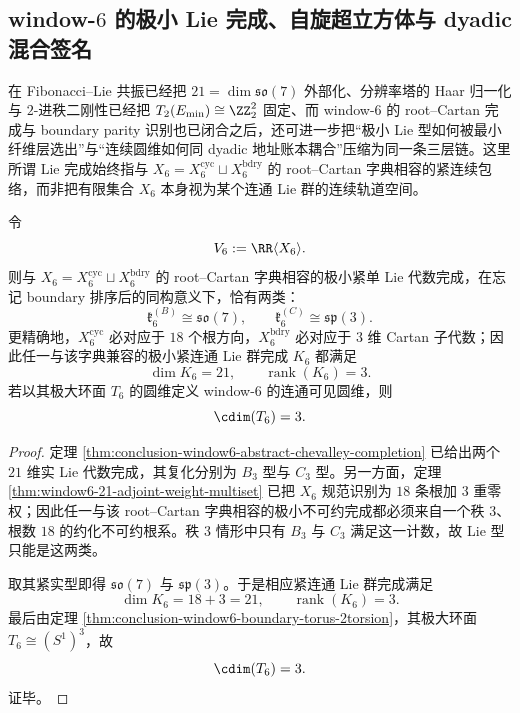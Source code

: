 \subsection{window-\texorpdfstring{$6$}{6} 的极小 Lie 完成、自旋超立方体与 dyadic 混合签名}\label{subsec:conclusion-window6-spin-minuscule-hypercube-signature}
在 Fibonacci--Lie 共振已经把 \(21=\dim \mathfrak{so}(7)\) 外部化、分辨率塔的 Haar 归一化与 \(2\)-进秩二刚性已经把 \(T_2(E_{\min})\cong \ZZ_2^2\) 固定、而 window-\(6\) 的 root--Cartan 完成与 boundary parity 识别也已闭合之后，还可进一步把“极小 Lie 型如何被最小纤维层选出”与“连续圆维如何同 dyadic 地址账本耦合”压缩为同一条三层链。这里所谓 Lie 完成始终指与 \(X_6=X_6^{\mathrm{cyc}}\sqcup X_6^{\mathrm{bdry}}\) 的 root--Cartan 字典相容的紧连续包络，而非把有限集合 \(X_6\) 本身视为某个连通 Lie 群的连续轨道空间。

\begin{theorem}\label{thm:conclusion-window6-minimal-compact-lie-completion-circle-rigidity}
令
\[
V_6:=\RR\langle X_6\rangle.
\]
则与 \(X_6=X_6^{\mathrm{cyc}}\sqcup X_6^{\mathrm{bdry}}\) 的 root--Cartan 字典相容的极小紧单 Lie 代数完成，在忘记 boundary 排序后的同构意义下，恰有两类：
\[
\mathfrak k_6^{(B)}\cong \mathfrak{so}(7),
\qquad
\mathfrak k_6^{(C)}\cong \mathfrak{sp}(3).
\]
更精确地，\(X_6^{\mathrm{cyc}}\) 必对应于 \(18\) 个根方向，\(X_6^{\mathrm{bdry}}\) 必对应于 \(3\) 维 Cartan 子代数；因此任一与该字典兼容的极小紧连通 Lie 群完成 \(K_6\) 都满足
\[
\dim K_6=21,
\qquad
\operatorname{rank}(K_6)=3.
\]
若以其极大环面 \(T_6\) 的圆维定义 window-\(6\) 的连通可见圆维，则
\[
\cdim(T_6)=3.
\]
\end{theorem}
\begin{proof}
定理 \ref{thm:conclusion-window6-abstract-chevalley-completion} 已给出两个 \(21\) 维实 Lie 代数完成，其复化分别为 \(B_3\) 型与 \(C_3\) 型。另一方面，定理 \ref{thm:window6-21-adjoint-weight-multiset} 已把 \(X_6\) 规范识别为 \(18\) 条根加 \(3\) 重零权；因此任一与该 root--Cartan 字典相容的极小不可约完成都必须来自一个秩 \(3\)、根数 \(18\) 的约化不可约根系。秩 \(3\) 情形中只有 \(B_3\) 与 \(C_3\) 满足这一计数，故 Lie 型只能是这两类。

取其紧实型即得 \(\mathfrak{so}(7)\) 与 \(\mathfrak{sp}(3)\)。于是相应紧连通 Lie 群完成满足
\[
\dim K_6=18+3=21,
\qquad
\operatorname{rank}(K_6)=3.
\]
最后由定理 \ref{thm:conclusion-window6-boundary-torus-2torsion}，其极大环面 \(T_6\cong (S^1)^3\)，故
\[
\cdim(T_6)=3.
\]
证毕。
\end{proof}

